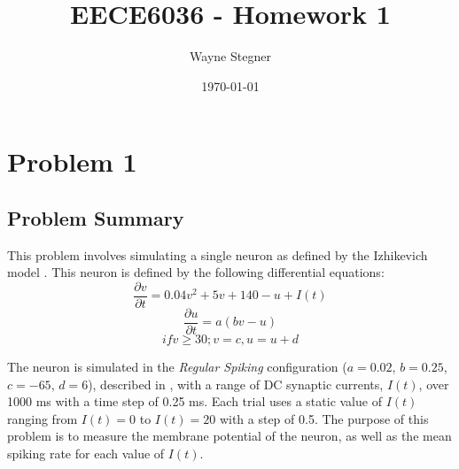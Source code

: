 \documentclass[a4paper, 11pt, titlepage]{article}
\title{EECE6036 - Homework 1}
\author{Wayne Stegner}
\date{\today}
\begin{document}
  \maketitle
  \section{Problem 1}
  \subsection{Problem Summary}
  \par This problem involves simulating a single neuron as defined by the
  Izhikevich model \cite{Izhikevich2003}.
  This neuron is defined by the following differential equations:
  \begin{equation}
    \frac{\partial v}{\partial t} = 0.04v^{2} + 5v + 140 - u + I(t)
    \label{eq:dv}
  \end{equation}
  \begin{equation}
    \frac{\partial u}{\partial t} = a(bv - u)
    \label{eq:du}
  \end{equation}
  \begin{equation}
    if v \geq 30; v = c, u = u + d
    \label{eq:cond}
  \end{equation}
  \par The neuron is simulated in the \textit{Regular Spiking} configuration
  ($a=0.02$, $b=0.25$, $c=-65$, $d=6$), described in
  \cite{Izhikevich2003,Izhikevich2004}, with a range of DC synaptic currents,
  $I(t)$, over 1000 ms with a time step of 0.25 ms.
  Each trial uses a static value of $I(t)$ ranging from $I(t)=0$ to $I(t)=20$
  with a step of 0.5.
  The purpose of this problem is to measure the membrane potential of the neuron, as well as
  the mean spiking rate for each value of $I(t)$.
\end{document}

